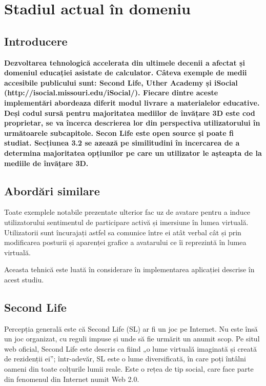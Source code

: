 \chapter{Stadiul actual în domeniu}

\section{Introducere}

\textbf{ Dezvoltarea tehnologică accelerata din ultimele decenii a afectat și domeniul educației asistate de calculator. Câteva exemple de medii accesibile publicului sunt: Second Life,  Uther Academy și iSocial (http://isocial.missouri.edu/iSocial/). Fiecare dintre aceste implementări abordeaza diferit modul livrare a materialelor educative. Deși codul sursă pentru majoritatea mediilor de învățare 3D este cod proprietar, se va încerca descrierea lor din perspectiva utilizatorului în următoarele subcapitole. Secon Life este open source și poate fi studiat. Secțiunea 3.2 se azează pe similitudini în incercarea de a determina majoritatea opțiunilor pe care un utilizator le așteapta de la mediile de învățare 3D.}


\section{Abordări similare}

\par Toate exemplele notabile prezentate ulterior fac uz de avatare pentru a induce utilizatorului sentimentul de participare activă și imersiune în lumea virtuală. Utilizatorii sunt încurajați astfel sa comunice între ei atât verbal cât și prin modificarea posturii și aparenței grafice a avatarului ce îi reprezintă în lumea virtuală.
\par Aceasta tehnică este luată în considerare în implementarea aplicației descrise în acest studiu.

\section{Second Life}
\par Percepția generală este că Second Life (SL) ar fi un joc pe Internet. Nu este însă un joc organizat, cu reguli impuse și unde să fie urmărit un anumit scop. Pe situl web oficial, Second Life este descris ca fiind „o lume virtuală imaginată și creată de rezidenții ei”; într-adevăr, SL este o lume diversificată, în care poți întâlni oameni din toate colțurile lumii reale. Este o rețea de tip social, care face parte din fenomenul din Internet numit Web 2.0.

